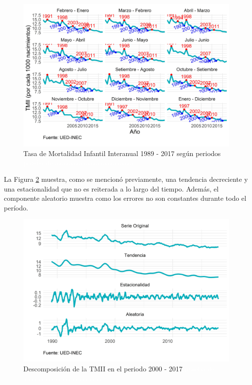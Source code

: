 \documentclass[
]{article}
\begin{document}
\begin{figure}[H]
\includegraphics[width=1\linewidth,height=1\textheight]{Tesis_files/figure-latex/tmiiplotperiodos-1} \caption{Tasa de Mortalidad Infantil Interanual 1989 - 2017 según periodos \textcolor{white}{prueba de aaaaaaaaaaaaaaaaaaaaaaa}}\label{fig:tmiiplotperiodos}
\end{figure}

La Figura \ref{fig:tmiiplotdescomposicion} muestra, como se mencionó
previamente, una tendencia decreciente y una estacionalidad que no es
reiterada a lo largo del tiempo. Además, el componente aleatorio muestra
como los errores no son constantes durante todo el período.

\begin{figure}[H]
\includegraphics[width=1\linewidth,height=1\textheight]{Tesis_files/figure-latex/tmiiplotdescomposicion-1} \caption{Descomposición de la TMII en el periodo 2000 - 2017 \textcolor{white}{prueba de aaaaaaaaaaaaaaaaaaaaaaa}}\label{fig:tmiiplotdescomposicion}
\end{figure}
\end{document}
